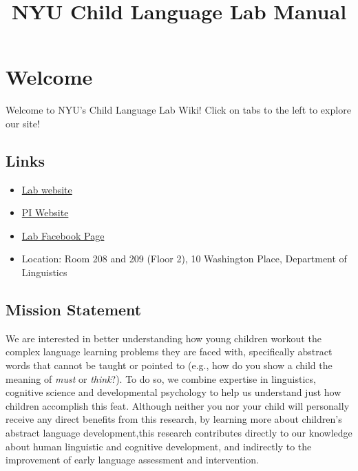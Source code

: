 \documentclass[
]{book}
\title{NYU Child Language Lab Manual}
\author{}
\date{\vspace{-2.5em}}
\begin{document}
\maketitle

{
\setcounter{tocdepth}{1}
\tableofcontents
}
\hypertarget{welcome}{%
\chapter{Welcome}\label{welcome}}

Welcome to NYU's Child Language Lab Wiki! Click on tabs to the left to explore our site!

\hypertarget{links}{%
\section*{Links}\label{links}}

\begin{itemize}
\item
  \href{https://wp.nyu.edu/childlanguagelab/}{Lab website}
\item
  \href{https://wp.nyu.edu/cournane/}{PI Website}
\item
  \href{https://www.facebook.com/NYUcll/}{Lab Facebook Page}
\item
  Location: Room 208 and 209 (Floor 2), 10 Washington Place, Department of Linguistics
\end{itemize}

\hypertarget{mission-statement}{%
\section*{Mission Statement}\label{mission-statement}}

We are interested in better understanding how young children workout the complex language learning problems they are faced with, specifically abstract words that cannot be taught or pointed to (e.g., how do you show a child the meaning of \emph{must} or \emph{think}?). To do so, we combine expertise in linguistics, cognitive science and developmental psychology to help us understand just how children accomplish this feat. Although neither you nor your child will personally receive any direct benefits from this research, by learning more about children's abstract language development,this research contributes directly to our knowledge about human linguistic and cognitive development, and indirectly to the improvement of early language assessment and intervention.
\end{document}
